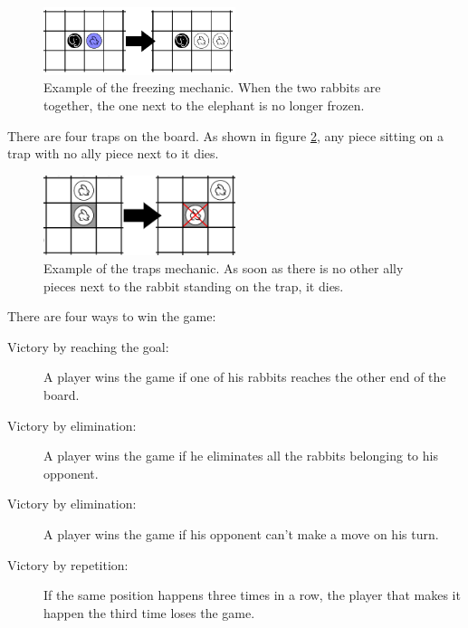 \begin{figure}[!h]
\centering
\includegraphics[width=0.5\textwidth]{1_Presentation/1.1_Arimaa_rules_Gabriel/Pictures/Freeze.png}
\caption[Example of the freezing mechanic.]{Example of the freezing mechanic. When the two rabbits are together, the one next to the elephant is no longer frozen.}
\label{fig:freeze}
\end{figure}

There are four traps on the board. As shown in figure \ref{fig:trap}, any piece sitting on a trap with no ally piece next to it dies.

\begin{figure}[!h]
\centering
\includegraphics[width=0.5\textwidth]{1_Presentation/1.1_Arimaa_rules_Gabriel/Pictures/Trap.png}
\caption[Example of the traps mechanic.]{Example of the traps mechanic. As soon as there is no other ally pieces next to the rabbit standing on the trap, it dies.}
\label{fig:trap}
\end{figure}

There are four ways to win the game:

\begin{description}
\item[Victory by reaching the goal:] A player wins the game if one of his rabbits reaches the other end of the board.
\item[Victory by elimination:] A player wins the game if he eliminates all the rabbits belonging to his opponent.
\item[Victory by elimination:] A player wins the game if his opponent can't make a move on his turn.
\item[Victory by repetition:] If the same position happens three times in a row, the player that makes it happen the third time loses the game.
\end{description}
